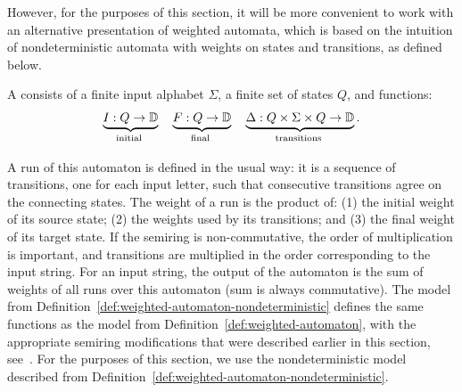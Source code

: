 However, for the purposes of this section, it  will be more convenient to work
with an alternative presentation of weighted automata, which is based on the
intuition of nondeterministic automata with weights on states and transitions,
as defined below. 
\begin{definition}
    \label{def:weighted-automaton-nondeterministic}
    \AP
    A  consists of a finite input alphabet $\Sigma$,  a finite set of states $Q$, and functions: 
    \begin{align}
        \label{eq:weight-functions}
    \myunderbrace{I : Q \to \domain}{initial}
    \quad
    \myunderbrace{F : Q \to \domain}{final}
    \quad
    \myunderbrace{\Delta : Q \times \Sigma \times Q \to \domain}{transitions}.
    \end{align}
\end{definition}
A run of this automaton is defined in the usual way: it is a sequence of
transitions, one for each input letter, such that consecutive transitions
agree on the connecting states. The weight of a run is the product of: (1) the
initial weight of its source state; (2) the weights used by its transitions;
and (3) the final weight of its target state. If the semiring is
non-commutative, the order of multiplication is  important, and transitions
are multiplied in the order corresponding to the input string. For an input
string, the output of the automaton is the sum of weights of all runs over
this automaton (sum is always commutative).  The model from
Definition~\ref{def:weighted-automaton-nondeterministic}  defines the same
functions as the model from Definition~\ref{def:weighted-automaton}, with the
appropriate semiring modifications that were described earlier in this
section, see~\cite[Lemma 8.3]{bojanczyk_automata_2025}. For the purposes of
this section, we use the nondeterministic  model described from
Definition~\ref{def:weighted-automaton-nondeterministic}.


